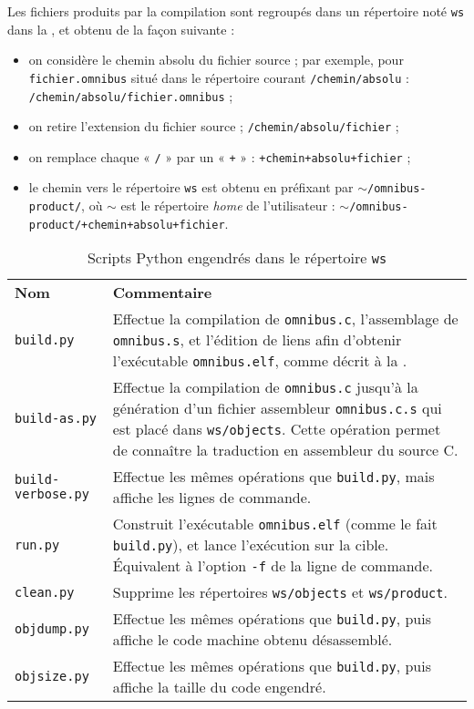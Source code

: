 \begin{OMNIBUS}[1]
Les fichiers produits par la compilation sont regroupés dans un répertoire noté \texttt{ws} dans la , et obtenu de la façon suivante :
\begin{itemize}
  \item on considère le chemin absolu du fichier source ; par exemple, pour {\tt f{}ichier.omnibus} situé dans le répertoire courant \texttt{/chemin/absolu} : \colorbox{gray!25}{\tt/chemin/absolu/f{}ichier.omnibus} ;
  \item on retire l'extension du fichier source ; \colorbox{gray!25}{\tt/chemin/absolu/f{}ichier} ;
  \item on remplace chaque « \texttt{/} » par un « \texttt{+} » : \colorbox{gray!25}{\tt+chemin+absolu+f{}ichier} ;
  \item le chemin vers le répertoire \texttt{ws} est obtenu en préfixant par \texttt{$\sim$/omnibus-product/}, où $\sim$ est le répertoire \emph{home} de l'utilisateur : \colorbox{gray!25}{\tt$\sim$/omnibus-product/+chemin+absolu+f{}ichier}.
\end{itemize}

\begin{table}[t!]
\centering
\begin{tabular}{p{2cm}p{11cm}}
  \textbf{Nom} & \textbf{Commentaire} \\
  \texttt{build.py} & Effectue la compilation de \texttt{omnibus.c}, l'assemblage de \texttt{omnibus.s}, et l'édition de liens afin d'obtenir l'exécutable \texttt{omnibus.elf}, comme décrit à la {}{compilationProgrammeOMNIBUS}. \\
  \texttt{build-as.py} & Effectue la compilation de \texttt{omnibus.c} jusqu'à la génération d'un fichier assembleur \texttt{omnibus.c.s} qui est placé dans \texttt{ws/objects}. Cette opération permet de connaître la traduction en assembleur du source C.\\
  \texttt{build-verbose.py} & Effectue les mêmes opérations que \texttt{build.py}, mais affiche les lignes de commande.\\
  \texttt{run.py} & Construit l'exécutable \texttt{omnibus.elf} (comme le fait \texttt{build.py}), et lance l'exécution sur la cible. Équivalent à l'option \texttt{-f} de la ligne de commande. \\
  \texttt{clean.py} & Supprime les répertoires \texttt{ws/objects} et \texttt{ws/product}. \\
  \texttt{objdump.py} & Effectue les mêmes opérations que \texttt{build.py}, puis affiche le code machine obtenu désassemblé. \\
  \texttt{objsize.py} & Effectue les mêmes opérations que \texttt{build.py}, puis affiche la taille du code engendré. \\
\end{tabular}
\caption{Scripts Python engendrés dans le répertoire \texttt{ws}}
\ligne
\end{table}


\end{OMNIBUS}

